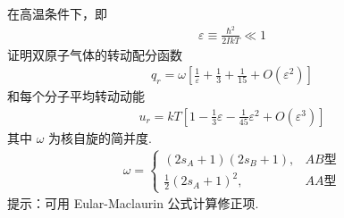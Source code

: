 \documentclass{assignment}
\begin{document}
\begin{prob}
    在高温条件下，即
    \begin{align}
        \varepsilon\equiv\frac{\hbar^2}{2IkT}\ll 1
    \end{align}
    证明双原子气体的转动配分函数
    \begin{align}
        q_r=\omega\left[\frac{1}{\varepsilon}+\frac{1}{3}+\frac{1}{15}+O(\varepsilon^2)\right]
    \end{align}
    和每个分子平均转动动能
    \begin{align}
        u_r=kT\left[1-\frac{1}{3}\varepsilon-\frac{1}{45}\varepsilon^2+O(\varepsilon^3)\right]
    \end{align}
    其中 $\omega$ 为核自旋的简并度.
    \begin{align}
        \omega=\left\{\begin{array}{ll}
            (2s_A+1)(2s_B+1),&AB\text{型}\\
            \frac{1}{2}(2s_A+1)^2,&AA\text{型}
        \end{array}\right.
    \end{align}
    提示：可用 Eular-Maclaurin 公式计算修正项.
\end{prob}
\begin{pf}

\end{pf}
\end{document}
